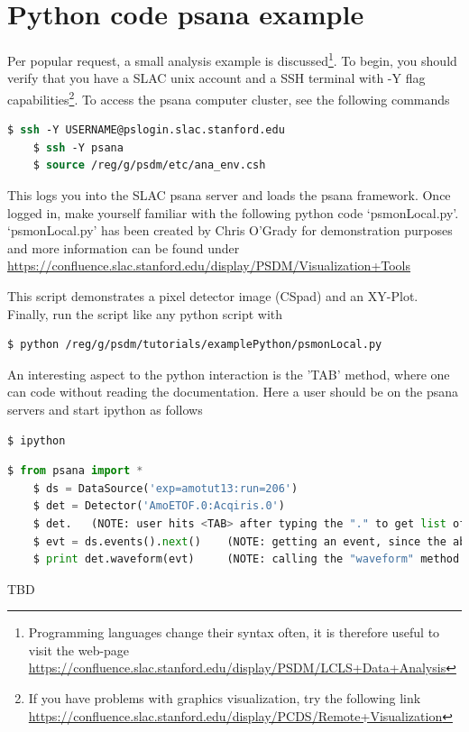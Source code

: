 \section{Python code psana example}\label{sec:python-example}
Per popular request, a small analysis example is discussed\footnote{Programming languages change their syntax often, it is therefore useful to visit the web-page\\ \url{https://confluence.slac.stanford.edu/display/PSDM/LCLS+Data+Analysis}}. To begin, you should verify that you have a SLAC unix account and a SSH terminal with -Y flag capabilities\footnote{If you have problems with graphics visualization, try the following link\\ \url{https://confluence.slac.stanford.edu/display/PCDS/Remote+Visualization}}. To access the psana computer cluster, see the following commands
\begin{lstlisting}[language=csh,basicstyle=\footnotesize]
	$ ssh -Y USERNAME@pslogin.slac.stanford.edu
	$ ssh -Y psana
	$ source /reg/g/psdm/etc/ana_env.csh
\end{lstlisting}
This logs you into the SLAC psana server and loads the psana framework. Once logged in, make yourself familiar with the following python code ‘psmonLocal.py’. ‘psmonLocal.py’ has been created by Chris O'Grady for demonstration purposes and more information can be found under\\
\url{https://confluence.slac.stanford.edu/display/PSDM/Visualization+Tools}

This script demonstrates a pixel detector image (CSpad) and an XY-Plot. Finally, run the script like any python script with
\begin{lstlisting}[language=csh]
	$ python /reg/g/psdm/tutorials/examplePython/psmonLocal.py
\end{lstlisting}
An interesting aspect to the python interaction is the 'TAB' method, where one can code without reading the documentation. Here a user should be on the psana servers and start ipython as follows
\begin{lstlisting}[language=csh,basicstyle=\footnotesize]
	$ ipython
\end{lstlisting}
\begin{lstlisting}[language=Python,basicstyle=\footnotesize]
	$ from psana import *
	$ ds = DataSource('exp=amotut13:run=206')
	$ det = Detector('AmoETOF.0:Acqiris.0')
	$ det.   (NOTE: user hits <TAB> after typing the "." to get list of available methods)
	$ evt = ds.events().next()    (NOTE: getting an event, since the above "Definition" line requires it)
	$ print det.waveform(evt)     (NOTE: calling the "waveform" method as required by the above "Definition" line)
\end{lstlisting}
TBD
%
%
%

